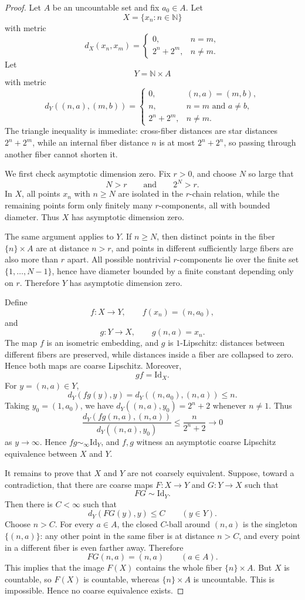 \documentclass[11pt]{article}
\newcommand{\N}{\mathbb N}
\begin{document}
\begin{proof}
Let \(A\) be an uncountable set and fix \(a_0\in A\).  Let
\[
X=\{x_n:n\in\N\}
\]
with metric
\[
d_X(x_n,x_m)=
\begin{cases}
0,& n=m,\\
2^n+2^m,& n\ne m.
\end{cases}
\]
Let
\[
Y=\N\times A
\]
with metric
\[
d_Y((n,a),(m,b))=
\begin{cases}
0,& (n,a)=(m,b),\\
n,& n=m\text{ and }a\ne b,\\
2^n+2^m,& n\ne m.
\end{cases}
\]
The triangle inequality is immediate: cross-fiber distances are star distances
\(2^n+2^m\), while an internal fiber distance \(n\) is at most \(2^n+2^n\), so passing through
another fiber cannot shorten it.

We first check asymptotic dimension zero.  Fix \(r>0\), and choose \(N\) so large that
\[
N>r\qquad\text{and}\qquad 2^N>r.
\]
In \(X\), all points \(x_n\) with \(n\geq N\) are isolated in the \(r\)-chain relation, while
the remaining points form only finitely many \(r\)-components, all with bounded diameter.
Thus \(X\) has asymptotic dimension zero.

The same argument applies to \(Y\).  If \(n\geq N\), then distinct points in the fiber
\(\{n\}\times A\) are at distance \(n>r\), and points in different sufficiently large fibers
are also more than \(r\) apart.  All possible nontrivial \(r\)-components lie over the finite
set \(\{1,\ldots,N-1\}\), hence have diameter bounded by a finite constant depending only on
\(r\).  Therefore \(Y\) has asymptotic dimension zero.

Define
\[
f:X\to Y,\qquad f(x_n)=(n,a_0),
\]
and
\[
g:Y\to X,\qquad g(n,a)=x_n.
\]
The map \(f\) is an isometric embedding, and \(g\) is \(1\)-Lipschitz: distances between
different fibers are preserved, while distances inside a fiber are collapsed to zero.  Hence
both maps are coarse Lipschitz.  Moreover,
\[
g f=\mathrm{Id}_X.
\]
For \(y=(n,a)\in Y\),
\[
d_Y(f g(y),y)=d_Y((n,a_0),(n,a))\leq n.
\]
Taking \(y_0=(1,a_0)\), we have \(d_Y((n,a),y_0)=2^n+2\) whenever \(n\ne 1\).  Thus
\[
\frac{d_Y(f g(n,a),(n,a))}{d_Y((n,a),y_0)}
\leq \frac{n}{2^n+2}\longrightarrow 0
\]
as \(y\to\infty\).  Hence \(f g\sim_\infty \mathrm{Id}_Y\), and \(f,g\) witness an
asymptotic coarse Lipschitz equivalence between \(X\) and \(Y\).

It remains to prove that \(X\) and \(Y\) are not coarsely equivalent.  Suppose, toward a
contradiction, that there are coarse maps \(F:X\to Y\) and \(G:Y\to X\) such that
\[
F G\sim \mathrm{Id}_Y.
\]
Then there is \(C<\infty\) such that
\[
d_Y(FG(y),y)\leq C\qquad(y\in Y).
\]
Choose \(n>C\).  For every \(a\in A\), the closed \(C\)-ball around \((n,a)\) is the singleton
\(\{(n,a)\}\): any other point in the same fiber is at distance \(n>C\), and every point in a
different fiber is even farther away.  Therefore
\[
F G(n,a)=(n,a)\qquad(a\in A).
\]
This implies that the image \(F(X)\) contains the whole fiber \(\{n\}\times A\).  But \(X\)
is countable, so \(F(X)\) is countable, whereas \(\{n\}\times A\) is uncountable.  This is
impossible.  Hence no coarse equivalence exists.
\end{proof}
\end{document}
